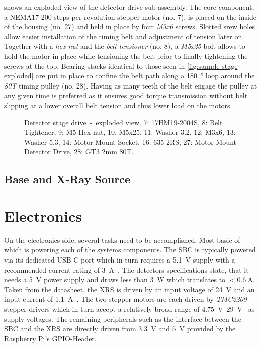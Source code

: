              shows an exploded view of the detector drive sub-assembly.
            The core component, a NEMA17 \num{200} steps per revolution stepper motor (no. 7), is placed on the inside of the housing (no. 27) and held in place by four \textit{M3x6} screws.
            Slotted srew holes allow easier installation of the timing belt and adjustment of tension later on.
            Together with a \textit{hex nut} and the \textit{belt tensioner} (no. 8), a \textit{M5x25} bolt allows to hold the motor in place while tensioning the belt prior to finally tightening the screws at the top.
            Bearing stacks identical to those seen in \cref{fig:sample stage exploded} are put in place to confine the belt path along a \qty{180}{\degree} loop around the \textit{80T} timing pulley (no. 28).
            Having as many teeth of the belt engage the pulley at any given time is preferred as it ensures good torque transmission without belt slipping at a lower overall belt tension and thus lower load on the motors.
            \begin{figure}[h]
                \centering
                
                \caption[Detector stage drive~-~exploded view.]{Detector stage drive~-~exploded view. 7: 17HM19-2004S, 8: Belt Tightener, 9: M5 Hex nut, 10, M5x25, 11: Washer 3.2, 12: M3x6, 13: Washer 5.3, 14: Motor Mount Socket, 16: 635-2RS, 27: Motor Mount Detector Drive, 28: GT3 2mm 80T.}
                \label{fig:detector drive exploded}
            \end{figure}

        \subsection{Base and X-Ray Source}
            \lipsum

    \section{Electronics}
        On the electronics side, several tasks need to be accomplished.
        Most basic of which is powering each of the systems components.
        The SBC is typically powered via its dedicated USB-C port which in turn requires a \qty{5.1}{\volt} supply with a recommended current rating of \qty{3}{\ampere}~\cite{Manual.Documentation.RPF}.
        The detectors specifications state, that it needs a \qty{5}{\volt} power supply and draws less than \qty{3}{\watt} which translates to \(<\qty{0.6}{\ampere}\).
        Taken from the datasheet, the XRS is driven by an input voltage of \qty{24}{\volt} and an input current of \qty{1.1}{\ampere}~\cite{Manual.MAGPRODataSheet.QD}.
        The two stepper motors are each driven by \textit{TMC2209} stepper drivers which in turn accept a relatively broad range of \qtyrange{4.75}{29}{\volt}~\cite{Manual.TMC2209Datasheet} as supply voltages.
        The remaining peripherals such as the interface between the SBC and the XRS are directly driven from \qty{3.3}{\volt} and \qty{5}{\volt} provided by the Raspberry Pi's GPIO-Header.

